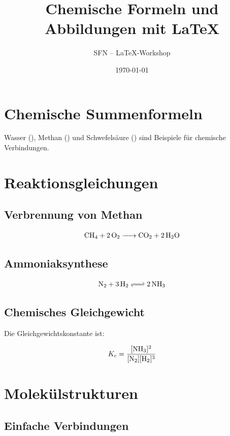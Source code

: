 \documentclass[11pt,a4paper]{scrartcl}
\title{Chemische Formeln und Abbildungen mit LaTeX}
\author{SFN -- LaTeX-Workshop}
\date{\today}
\begin{document}
	
	\maketitle
	\tableofcontents
	
	\section{Chemische Summenformeln}
	
	Wasser (), Methan ()
	und Schwefelsäure ()
	sind Beispiele für chemische Verbindungen.
	
	\section{Reaktionsgleichungen}
	
	\subsection{Verbrennung von Methan}
	
	\begin{equation}
		\ce{CH4 + 2 O2 -> CO2 + 2 H2O}
		\label{eq:methan}
	\end{equation}
	
	\subsection{Ammoniaksynthese}
	
	\begin{equation}
		\ce{N2 + 3 H2 <=> 2 NH3}
	\end{equation}
	
	\subsection{Chemisches Gleichgewicht}
	
	Die Gleichgewichtskonstante ist:
	
	\begin{equation}
		K_c = \frac{
			[\ce{NH3}]^2
		}{
			[\ce{N2}][\ce{H2}]^3
		}
	\end{equation}
	
	\section{Molekülstrukturen}
	
	\subsection{Einfache Verbindungen}
	
\end{document}
